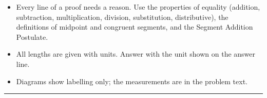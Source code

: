 \documentclass[12pt]{article}
\begin{document}

\begin{itemize}[leftmargin=0.8cm, itemsep=1pt, topsep=2pt]
  \item Every line of a proof needs a reason. Use the properties of equality (addition, subtraction, multiplication, division, substitution, distributive), the definitions of midpoint and congruent segments, and the Segment Addition Postulate.
  \item All lengths are given with units. Answer with the unit shown on the answer line.
  \item Diagrams show labelling only; the measurements are in the problem text.
\end{itemize}

\vspace{0.2cm}\noindent\rule{\linewidth}{0.4pt}

\end{document}
